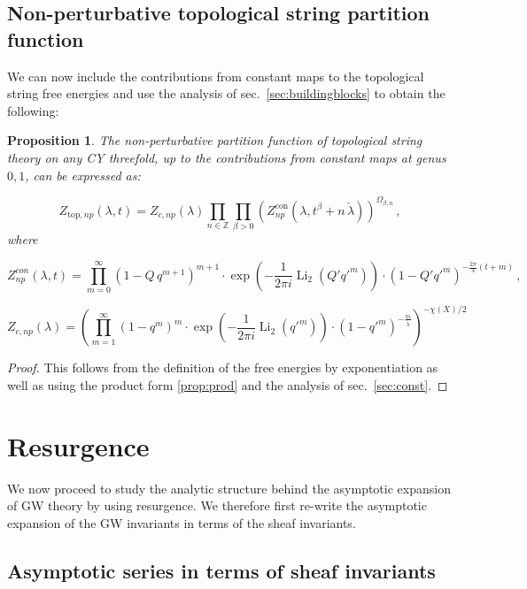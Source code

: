 \documentclass[a4paper,12pt,justification=centering]{article}
\numberwithin{equation}{section}
\theoremstyle{plain}%
\newtheorem{prop}[thm]{Proposition}
\theoremstyle{definition}
\begin{document}
\subsection{Non-perturbative topological string partition function}

We can now include the contributions from constant maps to the topological string free energies and use the analysis of sec.~\ref{sec:buildingblocks} to obtain the following:
\begin{prop}
The non-perturbative partition function of topological string theory on any CY threefold, up to the contributions from constant maps at genus $0,1$, can be expressed as:

\begin{equation}
Z_{\textrm{top},np}(\lambda,t) =  Z_{c,np}(\lambda)  \prod_{n\in\mathbb{Z}} \prod_{\beta>0} \left( Z^{\textrm{con}}_{np} (\lambda, t^{\beta}+ n \, \check{\lambda})\right)^{\Omega_{\beta,n}}\,,
\end{equation}
where

$$Z^{con}_{np}(\lambda,t)= \prod_{m=0}^{\infty} (1-Q\, q^{m+1})^{m+1}  \cdot \exp\left(-\frac{1}{2\pi i} \operatorname{Li}_2(Q' q'^m)\right) \cdot (1-Q' q'^m)^{-\frac{2\pi}{\lambda}\left( t+m\right)}\,, $$

$$
Z_{c,np}(\lambda)= \left( \prod_{m=1}^{\infty} (1- q^{m})^{m}  \cdot \exp\left(-\frac{1}{2\pi i} \operatorname{Li}_2(q'^m)\right) \cdot (1-q'^m)^{-\frac{ m}{\check{\lambda}}}\right)^{-\chi(X)/2}
$$


\end{prop}

\begin{proof} 
This follows from the definition of the free energies by exponentiation as well as using the product form \eqref{prop:prod} and the analysis of sec.~\ref{sec:const}.
 
\end{proof}



\section{Resurgence}

We now proceed to study the analytic structure behind the asymptotic expansion of GW theory by using resurgence. We therefore first re-write the asymptotic expansion of the GW invariants in terms of the sheaf invariants. 

\subsection{Asymptotic series in terms of sheaf invariants}
\end{document}
